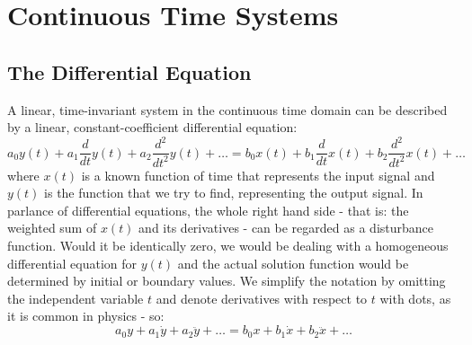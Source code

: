 \section{Continuous Time Systems}


\subsection{The Differential Equation}
A linear, time-invariant system in the continuous time domain can be described by a linear, constant-coefficient differential equation:
\begin{equation}
   a_0 y(t) + a_1 \frac{d}{dt} y(t) + a_2 \frac{d^2}{d t^2} y(t) + \ldots  
 = b_0 x(t) + b_1 \frac{d}{dt} x(t) + b_2 \frac{d^2}{d t^2} x(t) + \ldots 
\end{equation}
where $x(t)$ is a known function of time that represents the input signal and $y(t)$ is the function that we try to find, representing the output signal. In  parlance of differential equations, the whole right hand side - that is: the weighted sum of $x(t)$ and its derivatives - can be regarded as a disturbance function. Would it be identically zero, we would be dealing with a homogeneous differential equation for $y(t)$ and the actual solution function would be determined by initial or boundary values. We simplify the notation by omitting the independent variable $t$ and denote derivatives with respect to $t$ with dots, as it is common in physics - so:
\begin{equation}
 a_0 y + a_1 \dot{y} + a_2 \ddot{y} + \ldots = b_0 x + b_1 \dot{x} + b_2 \ddot{x} + \ldots 
\end{equation}  

